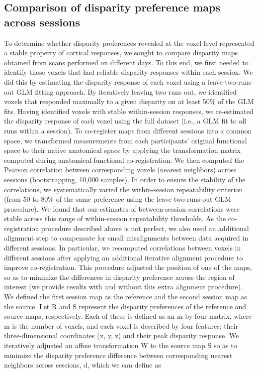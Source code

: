 \subsection{Comparison of disparity preference maps across sessions}
To determine whether disparity preferences revealed at the voxel level represented a stable property of cortical responses, we sought to compare disparity maps obtained from scans performed on different days. To this end, we first needed to identify those voxels that had reliable disparity responses within each session. We did this by estimating the disparity response of each voxel using a leave-two-runs-out GLM fitting approach. By iteratively leaving two runs out, we identified voxels that responded maximally to a given disparity on at least 50\% of the GLM fits. Having identified voxels with stable within-session responses, we re-estimated the disparity response of each voxel using the full dataset (i.e., a GLM fit to all runs within a session). To co-register maps from different sessions into a common space, we transformed measurements from each participants' original functional space to their native anatomical space by applying the transformation matrix computed during anatomical-functional co-registration. We then computed the Pearson correlation between corresponding voxels (nearest neighbors) across sessions (bootstrapping, 10,000 samples). In order to ensure the stability of the correlations, we systematically varied the within-session repeatability criterion (from 50 to 80\% of the same preference using the leave-two-runs-out GLM procedure). We found that our estimates of between-session correlations were stable across this range of within-session repeatability thresholds.
As the co-registration procedure described above is not perfect, we also used an additional alignment step to compensate for small misalignments between data acquired in different sessions. In particular, we recomputed correlations between voxels in different sessions after applying an additional iterative alignment procedure to improve co-registration. This procedure adjusted the position of one of the maps, so as to minimize the differences in disparity preference across the region of interest (we provide results with and without this extra alignment procedure). We defined the first session map as the reference and the second session map as the source. Let R and S represent the disparity preferences of the reference and source maps, respectively. Each of these is defined as an m-by-four matrix, where m is the number of voxels, and each voxel is described by four features: their three-dimensional coordinates (x, y, z) and their peak disparity response. We iteratively adjusted an affine transformation W to the source map S so as to minimize the disparity preference difference between corresponding nearest neighbors across sessions, d, which we can define as

